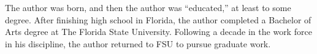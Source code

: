 \documentclass[11pt]{fsuthesis}
\begin{document}






\appendix



\renewcommand*{\bibname}{References}






\begin{biosketch}
The author was born, and then the author was ``educated,'' at least to
some degree.  After finishing high school in Florida, the author
completed a Bachelor of Arts degree at The Florida State University.
Following a decade in the work force in his discipline, the author
returned to FSU to pursue graduate work.
\end{biosketch}

\end{document}
